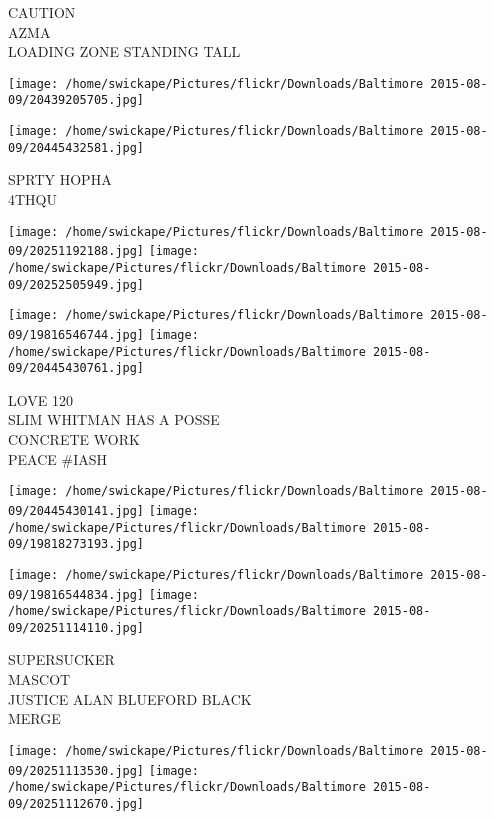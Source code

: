 \documentclass[10pt,letterpaper]{article}
\begin{document}
CAUTION\\
AZMA\\
LOADING ZONE STANDING TALL\\
\pagebreak

\texttt{[image: /home/swickape/Pictures/flickr/Downloads/Baltimore 2015-08-09/20439205705.jpg]}

\vspace{0.25in}
\texttt{[image: /home/swickape/Pictures/flickr/Downloads/Baltimore 2015-08-09/20445432581.jpg]}

SPRTY HOPHA\\
4THQU\\
\pagebreak

\texttt{[image: /home/swickape/Pictures/flickr/Downloads/Baltimore 2015-08-09/20251192188.jpg]}
\texttt{[image: /home/swickape/Pictures/flickr/Downloads/Baltimore 2015-08-09/20252505949.jpg]}

\texttt{[image: /home/swickape/Pictures/flickr/Downloads/Baltimore 2015-08-09/19816546744.jpg]}
\texttt{[image: /home/swickape/Pictures/flickr/Downloads/Baltimore 2015-08-09/20445430761.jpg]}

LOVE 120\\
SLIM WHITMAN HAS A POSSE\\
CONCRETE WORK\\
PEACE \#IASH\\
\pagebreak

\texttt{[image: /home/swickape/Pictures/flickr/Downloads/Baltimore 2015-08-09/20445430141.jpg]}
\texttt{[image: /home/swickape/Pictures/flickr/Downloads/Baltimore 2015-08-09/19818273193.jpg]}

\texttt{[image: /home/swickape/Pictures/flickr/Downloads/Baltimore 2015-08-09/19816544834.jpg]}
\texttt{[image: /home/swickape/Pictures/flickr/Downloads/Baltimore 2015-08-09/20251114110.jpg]}

SUPERSUCKER\\
MASCOT\\
JUSTICE ALAN BLUEFORD BLACK\\
MERGE\\
\pagebreak

\texttt{[image: /home/swickape/Pictures/flickr/Downloads/Baltimore 2015-08-09/20251113530.jpg]}
\texttt{[image: /home/swickape/Pictures/flickr/Downloads/Baltimore 2015-08-09/20251112670.jpg]}
\end{document}
